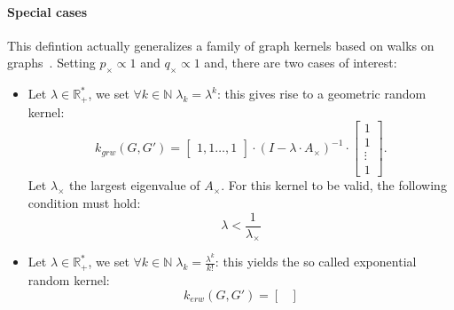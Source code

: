             \paragraph{Special cases}
                This defintion actually generalizes a family of graph kernels based on walks on graphs~\parencite{vishwanathan2010graph}.
                Setting $p_{\times} \propto 1$ and $q_{\times} \propto 1$ and, there are two cases of interest:
                \begin{itemize}
                    \item Let \(\lambda \in \mathbb{R}^*_+\), we set \(\forall k\in \mathbb{N} \; \lambda_k = \lambda^k\): this gives rise to a geometric random kernel:
                            \begin{equation}
                                \label{eq::geometric_random_kernel}
                                k_{grw}(G, G') = \begin{bmatrix}
                                    1, 1\dots,1
                                \end{bmatrix}\cdot \left(I - \lambda\cdot A_{\times}\right)^{-1}\cdot\begin{bmatrix}
                                    1\\
                                    1\\
                                    \vdots\\
                                    1
                                \end{bmatrix}.
                            \end{equation}
                            Let \(\lambda_{\times}\) the largest eigenvalue of \(A_{\times}\).
                            For this kernel to be valid, the following condition must hold:
                            \begin{equation}
                                \label{eq::condition_geometric_kernel_convergence}
                                \lambda < \frac{1}{\lambda_{\times}}
                            \end{equation}
                    \item Let \(\lambda \in \mathbb{R}^*_+\), we set \(\forall k\in \mathbb{N} \; \lambda_k = \frac{\lambda^k}{k!}\): this yields the so called exponential random kernel:
                            \begin{equation}
                                \label{eq::geometric_random_kernel}
                                k_{erw}(G, G') = \begin{bmatrix}

\end{bmatrix}
\end{equation}
\end{itemize}
